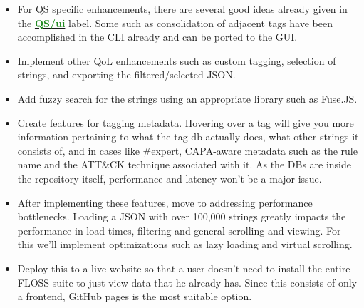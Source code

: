 \documentclass[12pt]{article}
\begin{document}
\begin{itemize}
        \begin{lstlisting}[language=yaml]
FLARE FLOSS RESULTS (version 3.1.1)
+------------------------+---------------------------+
| file path              | dotnet-hello.exe          |
| identified language    | dotnet (version unknown)  |
| static strings         | 57 (1028 characters)      |
+------------------------+---------------------------+
FLOSS Static Strings: ASCII and UTF-16 LE
Other FLOSS strings, such as stack, tight and decoded\end{lstlisting}
       Strings will be sorted section-wise as in the example, but with a clear indicator of whether they're static, stack, tight or decoded, and also language-based. The sidebar will expand to include FLOSS exclusive metadata such as identified language and number of extracted strings of each type.
    \item For QS specific enhancements, there are several good ideas already given in the \href{https://github.com/mandiant/flare-floss/issues?q=is\%3Aissue\%20state\%3Aopen\%20label\%3AQS\%2Fui}{\textbf{\textcolor{ForestGreen}{QS/ui}}} label. Some such as consolidation of adjacent tags have been accomplished in the CLI already and can be ported to the GUI.
    \item Implement other QoL enhancements such as custom tagging, selection of strings, and exporting the filtered/selected JSON.
    \item Add fuzzy search for the strings using an appropriate library such as Fuse.JS.
    \item Create features for tagging metadata. Hovering over a tag will give you more information pertaining to what the tag db actually does, what other strings it consists of, and in cases like \#expert, CAPA-aware metadata such as the rule name and the ATT\&CK technique associated with it. As the DBs are inside the repository itself, performance and latency won't be a major issue.
    \item After implementing these features, move to addressing performance bottlenecks. Loading a JSON with over 100,000 strings greatly impacts the performance in load times, filtering and general scrolling and viewing. For this we'll implement optimizations such as lazy loading and virtual scrolling.
    \item Deploy this to a live website so that a user doesn't need to install the entire FLOSS suite to just view data that he already has. Since this consists of only a frontend, GitHub pages is the most suitable option.
\end{itemize}
\end{document}
